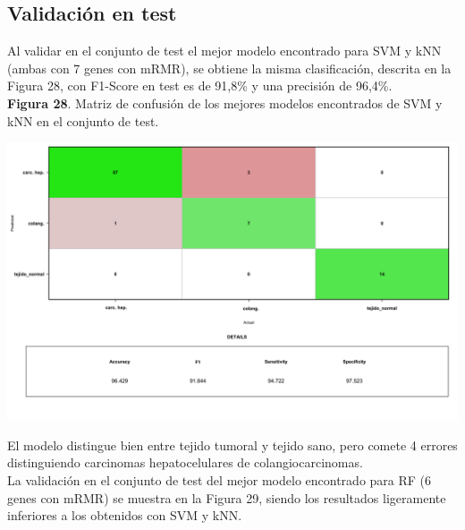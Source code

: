 \newpage

\subsection{Validación en test}



Al validar en el conjunto de test el mejor modelo encontrado para SVM y kNN (ambas con 7 genes con mRMR),  se obtiene la misma clasificación, descrita en la Figura 28, con F1-Score en test es de 91,8\% y una precisión de 96,4\%.\\

\textbf{Figura 28}. Matriz de confusión de los mejores modelos encontrados de SVM y kNN en el conjunto de test.

\begin{center}
	\includegraphics[width=1\textwidth]{figuras/28_higado_multiclase_15_svm_matriz_confusion_mejor_metodo_mejorado.png} 
\end{center}

El modelo distingue bien entre tejido tumoral y tejido sano, pero comete 4 errores distinguiendo carcinomas hepatocelulares de colangiocarcinomas.\\

La validación en el conjunto de test del mejor modelo encontrado para RF (6 genes con mRMR) se muestra en la Figura 29, siendo los resultados ligeramente inferiores a los obtenidos con SVM y kNN.\\

